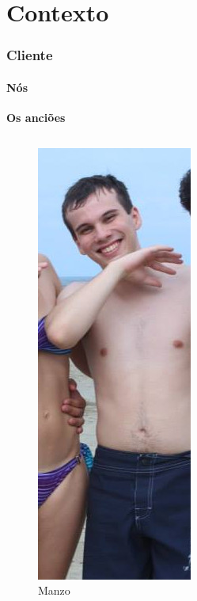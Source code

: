 \documentclass{beamer}
\begin{document}
  \section{Contexto}
    \begin{frame}
      \frametitle{Cliente}
      \framesubtitle{Nós}

      \begin{center}
        \textbf{Os anciões}
        \begin{columns}[c] %
           \begin{figure}
              \begin{center}
                \includegraphics[height=.5\textheight]{images/manzo.jpg}
                \caption{Manzo}
              \end{center}
            \end{figure}
           \begin{figure}
              \begin{center}

\end{center}
\end{figure}
\end{columns}
\end{center}
\end{frame}
\end{document}
